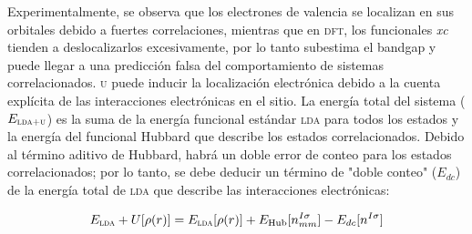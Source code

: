 
Experimentalmente, se observa que los electrones de valencia se localizan en sus orbitales debido a fuertes correlaciones, mientras que en \textsc{dft}, los funcionales \textit{xc} tienden a deslocalizarlos excesivamente,  por lo tanto subestima el bandgap  y puede llegar a una predicción falsa del comportamiento de sistemas correlacionados. \textsc{u} puede inducir la localización electrónica debido a la cuenta explícita de las interacciones electrónicas en el sitio\cite{Tolba2018}. La energía total del sistema ($E_{\textsc{lda+u}}$) es la suma de la energía funcional estándar \textsc{lda} para todos los estados y la energía del funcional Hubbard que describe los estados correlacionados. Debido al término aditivo de Hubbard, habrá un doble error de conteo para los estados correlacionados; por lo tanto, se debe deducir un término de "doble conteo" ($E_{dc}$) de la energía total de \textsc{lda} que describe las interacciones electrónicas:

$$E_{\textsc{lda}}+U[\rho(r)]=E_{\textsc{lda}}[\rho(r)]+ E_{\text{Hub}}[{n_{mm}^{I\sigma}}]-E_{dc}[n^{I\sigma}]$$







